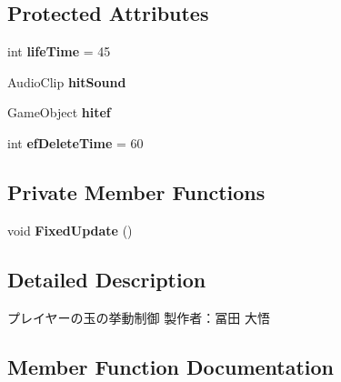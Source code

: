 \subsection*{Protected Attributes}
\begin{DoxyCompactItemize}
\item 
\mbox{\label{class_player_shot_a424ce0a11ece49f93bde37a0eb1639de}} 
int {\bfseries life\+Time} = 45
\item 
\mbox{\label{class_player_shot_a74a66116fb55d1fe86e4bb6b5d1b4e48}} 
Audio\+Clip {\bfseries hit\+Sound}
\item 
\mbox{\label{class_player_shot_a23e1791c2e4a7c5ddafec89cfa3b14fd}} 
Game\+Object {\bfseries hitef}
\item 
\mbox{\label{class_player_shot_a90081a5811184df1365177a460889e19}} 
int {\bfseries ef\+Delete\+Time} = 60
\end{DoxyCompactItemize}
\subsection*{Private Member Functions}
\begin{DoxyCompactItemize}
\item 
\mbox{\label{class_player_shot_a2776b727843a5981903633d9425d026a}} 
void {\bfseries Fixed\+Update} ()
\end{DoxyCompactItemize}


\subsection{Detailed Description}
プレイヤーの玉の挙動制御 製作者：冨田 大悟 



\subsection{Member Function Documentation}
\mbox{\label{class_player_shot_ab96887c0aa85a6977007c3465d737a13}} 
